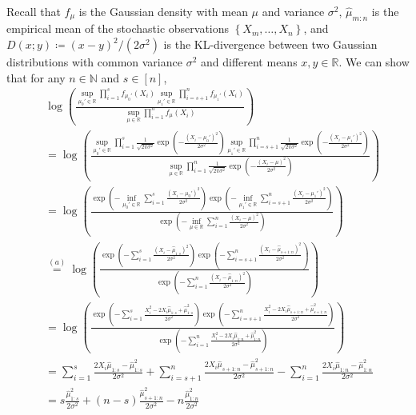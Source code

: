 \documentclass[12pt]{interact}
\newcommand{\lp}{\left(}
\newcommand{\rp}{\right)}
\newcommand{\lb}{\left[}
\newcommand{\rb}{\right]}
\newcommand{\lbp}{\left\{}
\newcommand{\rbp}{\right\}}
\newcommand{\mbb}{\mathbb}
\theoremstyle{plain}
\begin{document}
Recall that $f_{\mu}$ is the Gaussian density with mean $\mu$ and variance $\sigma^{2}$, $\hat{\mu}_{m:n}$ is the empirical mean of the stochastic observations $\lbp X_{m}, \dots, X_{n} \rbp$, and \textup{$ D \lp x;y\rp\coloneqq(x-y)^{2}/(2\sigma^{2})$} is the KL-divergence between two Gaussian distributions with common variance $\sigma^{2}$ and different means $x,y\in\mbb{R}$. We can show that for any $n\in\mbb{N}$ and  $s\in\lb n\rb$,
%
\begin{align}
&\log\lp\frac{\sup_{\mu_{0}'\in\mbb{R}}\prod_{i=1}^{s}f_{\mu_{0}'}\lp X_{i}\rp\sup_{\mu_{1}'\in\mbb{R}}\prod_{i=s+1}^{n}f_{\mu_{1}'}\lp X_{i}\rp}{\sup_{\mu\in\mbb{R}}\prod_{i=1}^{n}f_{\mu}\lp X_{i}\rp}\rp\nonumber\\
    &=\log\lp\frac{\sup_{\mu_{0}'\in\mbb{R}}\prod_{i=1}^{s}\frac{1}{\sqrt{2\pi\sigma^{2}}}\exp\lp-\frac{\lp X_{i}-\mu_{0}'\rp^{2}}{2\sigma^{2}}\rp\sup_{\mu_{1}'\in\mbb{R}}\prod_{i=s+1}^{n}\frac{1}{\sqrt{2\pi\sigma^{2}}}\exp\lp-\frac{\lp X_{i}-\mu_{1}'\rp^{2}}{2\sigma^{2}}\rp}{\sup_{\mu\in\mbb{R}}\prod_{i=1}^{n}\frac{1}{\sqrt{2\pi\sigma^{2}}}\exp\lp-\frac{\lp X_{i}-\mu\rp^{2}}{2\sigma^{2}}\rp}\rp\nonumber\\
    &=\log\lp\frac{\exp\lp-\inf_{\mu_{0}'\in\mbb{R}}\sum_{i=1}^{s}\frac{\lp X_{i}-\mu_{0}'\rp^{2}}{2\sigma^{2}}\rp\exp\lp-\inf_{\mu_{1}'\in\mbb{R}}\sum_{i=s+1}^{n}\frac{\lp X_{i}-\mu_{1}'\rp^{2}}{2\sigma^{2}}\rp}{\exp\lp-\inf_{\mu\in\mbb{R}}\sum_{i=1}^{n}\frac{\lp X_{i}-\mu\rp^{2}}{2\sigma^{2}}\rp}\rp\nonumber\\
    &\overset{(a)}{=}\log\lp\frac{\exp\lp-\sum_{i=1}^{s}\frac{\lp X_{i}-\hat{\mu}_{1:s}\rp^{2}}{2\sigma^{2}}\rp\exp\lp-\sum_{i=s+1}^{n}\frac{\lp X_{i}-\hat{\mu}_{s+1:n}\rp^{2}}{2\sigma^{2}}\rp}{\exp\lp-\sum_{i=1}^{n}\frac{\lp X_{i}-\hat{\mu}_{1:n}\rp^{2}}{2\sigma^{2}}\rp}\rp\nonumber\\
    &=\log\lp\frac{\exp\lp-\sum_{i=1}^{s}\frac{X_{i}^{2}-2X_{i}\hat{\mu}_{1:s}+\hat{\mu}_{1:s}^{2}}{2\sigma^{2}}\rp\exp\lp-\sum_{i=s+1}^{n}\frac{X_{i}^{2}-2X_{i}\hat{\mu}_{s+1:n}+\hat{\mu}_{s+1:n}^{2}}{2\sigma^{2}}\rp}{\exp\lp-\sum_{i=1}^{n}\frac{X_{i}^{2}-2X_{i}\hat{\mu}_{1:n}+\hat{\mu}_{1:n}^{2}}{2\sigma^{2}}\rp}\rp\nonumber\\
    &=\sum_{i=1}^{s}\frac{2X_{i}\hat{\mu}_{1:s}-\hat{\mu}_{1:s}^{2}}{2\sigma^{2}}+\sum_{i=s+1}^{n}\frac{2X_{i}\hat{\mu}_{s+1:n}-\hat{\mu}_{s+1:n}^{2}}{2\sigma^{2}}-\sum_{i=1}^{n}\frac{2X_{i}\hat{\mu}_{1:n}-\hat{\mu}_{1:n}^{2}}{2\sigma^{2}}\nonumber\\
    &=s\frac{\hat{\mu}_{1:s}^{2}}{2\sigma^{2}}+\lp n-s\rp\frac{\hat{\mu}_{s+1:n}^{2}}{2\sigma^{2}}-n\frac{\hat{\mu}_{1:n}^{2}}{2\sigma^{2}}\nonumber\\

\end{align}
\end{document}
